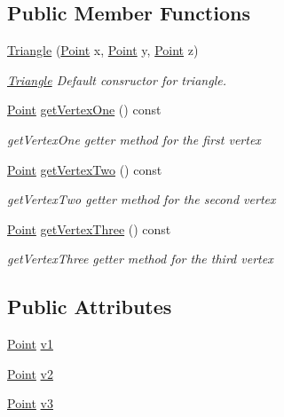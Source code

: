 \subsection*{Public Member Functions}
\begin{DoxyCompactItemize}
\item 
\hyperlink{class_triangle_a07f457e0c5ff143c4cabb39174859a1e}{Triangle} (\hyperlink{class_point}{Point} x, \hyperlink{class_point}{Point} y, \hyperlink{class_point}{Point} z)
\begin{DoxyCompactList}\small\item\em \hyperlink{class_triangle}{Triangle} Default consructor for triangle. \end{DoxyCompactList}\item 
\hyperlink{class_point}{Point} \hyperlink{class_triangle_a88a35d0b66c9636a9be88adc88d003aa}{get\+Vertex\+One} () const
\begin{DoxyCompactList}\small\item\em get\+Vertex\+One getter method for the first vertex \end{DoxyCompactList}\item 
\hyperlink{class_point}{Point} \hyperlink{class_triangle_ac1ae7463f829bcf377fd926b1ad10cac}{get\+Vertex\+Two} () const
\begin{DoxyCompactList}\small\item\em get\+Vertex\+Two getter method for the second vertex \end{DoxyCompactList}\item 
\hyperlink{class_point}{Point} \hyperlink{class_triangle_aed6ceca804b35da95d3d3c930de41e91}{get\+Vertex\+Three} () const
\begin{DoxyCompactList}\small\item\em get\+Vertex\+Three getter method for the third vertex \end{DoxyCompactList}\end{DoxyCompactItemize}
\subsection*{Public Attributes}
\begin{DoxyCompactItemize}
\item 
\hyperlink{class_point}{Point} \hyperlink{class_triangle_a64531c5c908b4ba8aca8b619b97a17bc}{v1}
\item 
\hyperlink{class_point}{Point} \hyperlink{class_triangle_a23721a1b58e5e427c1ac65e311e2828d}{v2}
\item 
\hyperlink{class_point}{Point} \hyperlink{class_triangle_a9ffab42f55ebdbaa549cb1cc592b1c76}{v3}
\end{DoxyCompactItemize}


